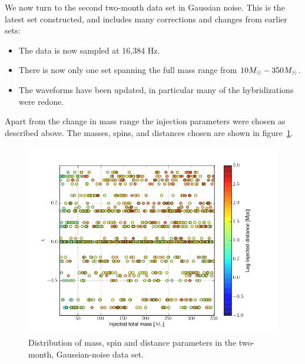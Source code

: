 We now turn to the second two-month data set in Gaussian noise.  This
is the latest set constructed, and includes many corrections and
changes from earlier sets:

\begin{itemize}
\item The data is now sampled at 16,384 Hz.
\item There is now only one set spanning the full mass range from $10
M_\odot - 350 M_\odot$.
\item The waveforms have been updated, in particular many of the
hybridizations were redone.
\end{itemize}


Apart from the change in mass range the injection parameters were
chosen as described above.  The masses, spins, and distances chosen
are shown in figure~\ref{f:ninja2_dataset}.

\begin{figure}
  \includegraphics[width=\linewidth]{figures/ninja2_results/ninja2_dataset}
  \caption[Parameters of the NINJA-2 two-month data set]{
  \label{f:ninja2_dataset}
Distribution of mass, spin and distance parameters in the two-month,
Gaussian-noise data set.
}
\end{figure}%


